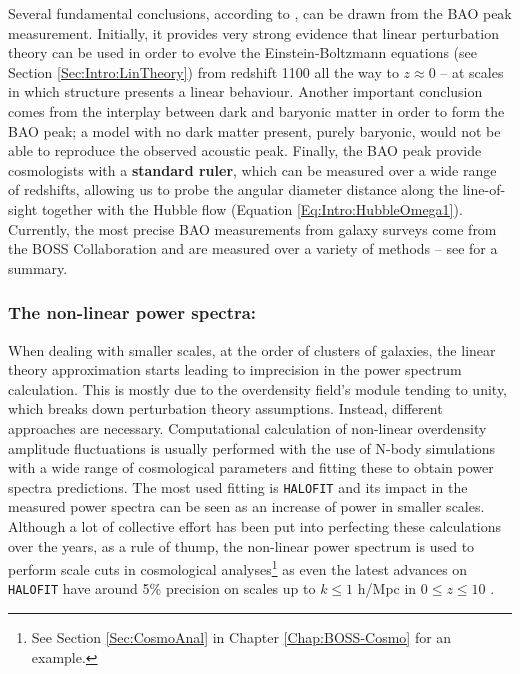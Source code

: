 \qquad Several fundamental conclusions, according to \cite{Einsenstein2005}, can be drawn from the BAO peak measurement. Initially, it provides very strong evidence that linear perturbation theory can be used in order to evolve the Einstein-Boltzmann equations (see Section \ref{Sec:Intro:LinTheory}) from redshift 1100 all the way to $z \approx 0$ -- at scales in which structure presents a linear behaviour. Another important conclusion comes from the interplay between dark and baryonic matter in order to form the BAO peak; a model with no dark matter present, purely baryonic, would not be able to reproduce the observed acoustic peak. Finally, the BAO peak provide cosmologists with a \textbf{standard ruler}, which can be measured over a wide range of redshifts, allowing us to probe the angular diameter distance along the line-of-sight together with the Hubble flow (Equation \ref{Eq:Intro:HubbleOmega1}). Currently, the most precise BAO measurements from galaxy surveys come from the BOSS Collaboration and are measured over a variety of methods -- see \citealt{2016BOSSCosmology} for a summary.

\subsubsection{The non-linear power spectra:}
When dealing with smaller scales, at the order of clusters of galaxies, the linear theory approximation starts leading to imprecision in the power spectrum calculation. This is mostly due to the overdensity field's module tending to unity, which breaks down perturbation theory assumptions. Instead, different approaches are necessary. Computational calculation of non-linear overdensity amplitude fluctuations is usually performed with the use of N-body simulations with a wide range of cosmological parameters and fitting these to obtain power spectra predictions. The most used fitting is \texttt{HALOFIT} \citep{2003HaloFit} and its impact in the measured power spectra can be seen as an increase of power in smaller scales. Although a lot of collective effort has been put into perfecting these calculations over the years, as a rule of thump, the non-linear power spectrum is used to perform scale cuts in cosmological analyses\footnote{See Section \ref{Sec:CosmoAnal} in Chapter \ref{Chap:BOSS-Cosmo} for an example.} as even the latest advances on \texttt{HALOFIT} have around 5\% precision on scales up to $k\leq 1$ h/Mpc in $0\leq z \leq 10$ \citep{Takahashi2012,Bird2012}. 

